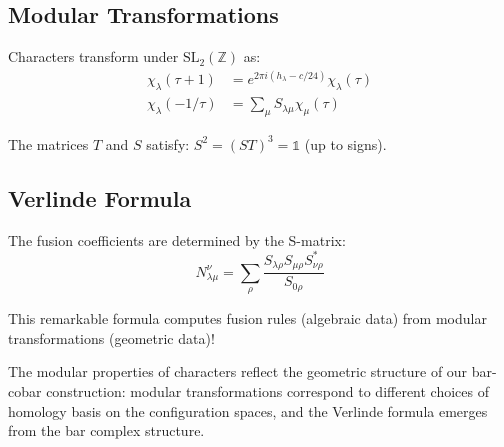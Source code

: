 \subsection{Modular Transformations}

\begin{theorem}
\label{thm:modular-transform-characters}
Characters transform under $\text{SL}_2(\mathbb{Z})$ as:
\begin{align}
\chi_\lambda(\tau + 1) &= e^{2\pi i(h_\lambda - c/24)}\chi_\lambda(\tau) \\
\chi_\lambda(-1/\tau) &= \sum_{\mu} S_{\lambda\mu} \chi_\mu(\tau)
\end{align}

The matrices $T$ and $S$ satisfy: $S^2 = (ST)^3 = \mathbb{1}$ (up to signs).
\end{theorem}

\subsection{Verlinde Formula}

\begin{theorem}
\label{thm:verlinde-formula}
The fusion coefficients are determined by the S-matrix:
$$N_{\lambda\mu}^\nu = \sum_{\rho} \frac{S_{\lambda\rho}S_{\mu\rho}S_{\nu\rho}^*}{S_{0\rho}}$$

This remarkable formula computes fusion rules (algebraic data) from modular transformations 
(geometric data)!
\end{theorem}

\begin{remark}
The modular properties of characters reflect the geometric structure of our bar-cobar 
construction: modular transformations correspond to different choices of homology basis 
on the configuration spaces, and the Verlinde formula emerges from the bar complex 
structure.
\end{remark}

